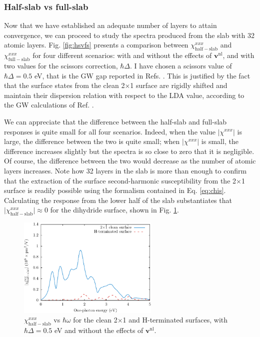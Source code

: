 \subsubsection{Half-slab vs full-slab}

Now that we have established an adequate number of layers to attain convergence,
we can proceed to study the spectra produced from the slab with 32 atomic
layers. Fig. \ref{fig:hsvfs} presents a comparison between
$\chi^{xxx}_{\mathrm{half-slab}}$ and $\chi^{xxx}_{\mathrm{full-slab}}$ for four
different scenarios: with and without the effects of $\mathbf{v}^\mathrm{nl}$,
and with two values for the scissors correction, $\hbar\Delta$. I have chosen a
scissors value of $\hbar\Delta=0.5$ eV, that is the GW gap reported in Refs.
\cite{rohlfingPRB95, garciaCPC01}. This is justified by the fact that the
surface states from the clean 2$\times$1 surface are rigidly shifted and
maintain their dispersion relation with respect to the LDA value, according to
the GW calculations of Ref.
\cite{rohlfingPRB95}.

We can appreciate that the difference between the half-slab and full-slab
responses is quite small for all four scenarios. Indeed, when the value
$\vert\chi^{xxx}\vert$ is large, the difference between the two is quite small;
when $\vert\chi^{xxx}\vert$ is small, the difference increases slightly but the
spectra is so close to zero that it is negligible. Of course, the difference
between the two would decrease as the number of atomic layers increases. Note
how 32 layers in the slab is more than enough to confirm that the extraction of
the surface second-harmonic susceptibility from the 2$\times$1 surface is
readily possible using the formalism contained in Eq. \eqref{eq:chis}.
Calculating the response from the lower half of the slab substantiates that
$\vert\chi^{xxx}_{\mathrm{half-slab}}\vert\approx 0$ for the dihydride surface,
shown in Fig. \ref{fig:topvbottom}.

\begin{figure}[H]
\centering 
\includegraphics[width=0.6\textwidth]{content/figures/fig-Si2x1-topvbottom}
\caption{$\chi^{xxx}_{\mathrm{half-slab}}$ vs $\hbar\omega$ for the clean
2$\times$1 and H-terminated surfaces, with $\hbar\Delta = 0.5$ eV and without
the effects of $\mathbf{v}^\mathrm{nl}$.}
\label{fig:topvbottom}
\end{figure}

